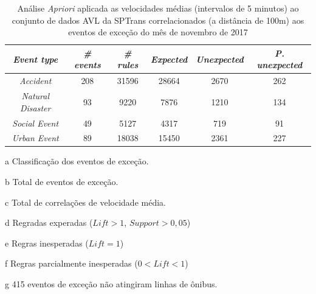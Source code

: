 \documentclass[
	12pt,				%
	oneside,			%
	a4paper,			%
	english,			%
	brazil				%
	]{abntex2ppgsi}
\begin{document}
\begin{apendicesenv}
\begin{table}[!htb]
\centering
\begin{threeparttable}
\caption {Análise \textit{Apriori} aplicada as velocidades médias (intervalos de 5 minutos) ao conjunto de dados AVL da SPTrans correlacionados (a distância de 100m) aos eventos de exceção do mês de novembro de 2017}
\label {tab:aprioriFull}
\begin{tabular}{c|c|c|c|c|c}
\hline
\textbf{\textit{Event type}}\tnote{a} & \textbf{\textit{\# events}}\tnote{b} & \textit{\textbf{\# rules}}\tnote{c} & \textbf{\textit{Expected}}\tnote{d} & \textbf{\textit{Unexpected}}\tnote{e} & \textbf{\textit{P. unexpected}}\tnote{f}   \\
\hline
\textit{Accident} & 208 & 31596 & 28664 & 2670 & 262 \\
\textit{Natural Disaster} & 93 & 9220 & 7876 & 1210 & 134 \\
\textit{Social Event} & 49 & 5127 & 4317 & 719 & 91 \\
\textit{Urban Event} & 89 & 18038 & 15450 & 2361 & 227 \\
\hline
\end{tabular}
\begin{tablenotes}
            \item[a] Classificação dos eventos de exceção.
            \item[b] Total de eventos de exceção.
            \item[c] Total de correlações de velocidade média.
            \item[d] Regradas experadas ($Lift > 1$, $Support > 0,05$)
            \item[e] Regras inesperadas ($Lift = 1$)
            \item[f] Regras parcialmente inesperadas ($0 < Lift < 1$)
            \item[g] 415 eventos de exceção não atingiram linhas de ônibus.
        \end{tablenotes}
\end{threeparttable}
\end{table}


\end{apendicesenv}
\end{document}
